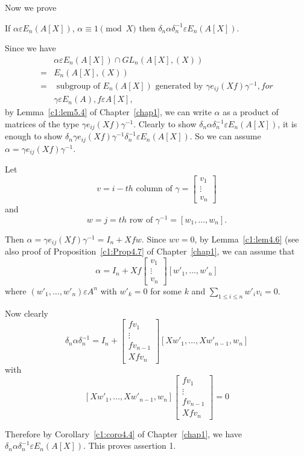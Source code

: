 Now we prove

\begin{assr}\label{c3:assr1}
If $\alpha \varepsilon E_n(A[X])$, $\alpha \equiv 1\pmod X$ then
$\delta_n\alpha\delta^{-1}_n\varepsilon E_n(A[X])$. 

Since we have
$$
\begin{aligned}
&\alpha \varepsilon E_n(A[X]) \cap GL_n(A[X],(X))\\
=& E_n(A[X],(X))\\
=& \text{ subgroup of } E_n(A[X]) \text{ generated by } \gamma
  e_{ij}(Xf)\gamma^{-1}, for\\
&\gamma \varepsilon E_n(A), f\varepsilon A[X],
\end{aligned}
$$
by Lemma~\ref{c1:lem5.4} of Chapter~\ref{chap1}, we can write $\alpha$
as a product of matrices of the type $\gamma
e_{ij}(Xf)\gamma^{-1}$. Clearly to show
$\delta_n\alpha\delta_n^{-1}\varepsilon E_n(A[X])$, it is enough to
show $\delta _n\gamma e_{ij}(Xf)\gamma^{-1}\delta^{-1}_n\varepsilon
E_n(A[X])$. So we can assume $\alpha=\gamma e_{ij}(Xf)\gamma^{-1}$. 

Let 
$$
v=i-th \text{ column of } \gamma=
\begin{bmatrix}
v_1\\
\vdots\\
v_n
\end{bmatrix}
$$
and 
$$
w=j=th \text{ row of }\gamma^{-1}=[w_1,\ldots, w_n].
$$

Then $\alpha=\gamma e_{ij}(Xf)\gamma^{-1}=I_n+Xfw$. Since $wv=0$, by
Lemma~\ref{c1:lem4.6} (see also proof of Proposition~\ref{c1:Prop4.7}
of Chapter~\ref{chap1}, we can assume that 
$$
\alpha=I_n+Xf
\begin{bmatrix}
v_1\\
\vdots\\
v_n
\end{bmatrix} [w'_1,\ldots, w'_n]
$$
where $(w'_1,\ldots,w'_n) \varepsilon A^{n}$ with $w'_k=0$ for some
$k$ and $\sum\limits_{1\leq i \leq n}w'_iv_i=0$. 

Now clearly
$$
\delta_n\alpha\delta^{-1}_n=I_n+
\begin{bmatrix}
fv_1\\
\vdots\\
fv_{n-1}\\
Xfv_n
\end{bmatrix} [Xw'_1,\ldots, Xw'_{n-1},w_n]
$$
with
$$
[Xw'_1,\ldots,Xw'_{n-1},w_n]
\begin{bmatrix}
fv_1\\
\vdots\\
fv_{n-1}\\
Xfv_n
\end{bmatrix}=0
$$

Therefore by Corollary~\ref{c1:coro4.4} of Chapter~\ref{chap1}, we
have $\delta_n\alpha \delta^{-1}_n\varepsilon E_n(A[X])$. This proves
assertion 1.
\end{assr}


